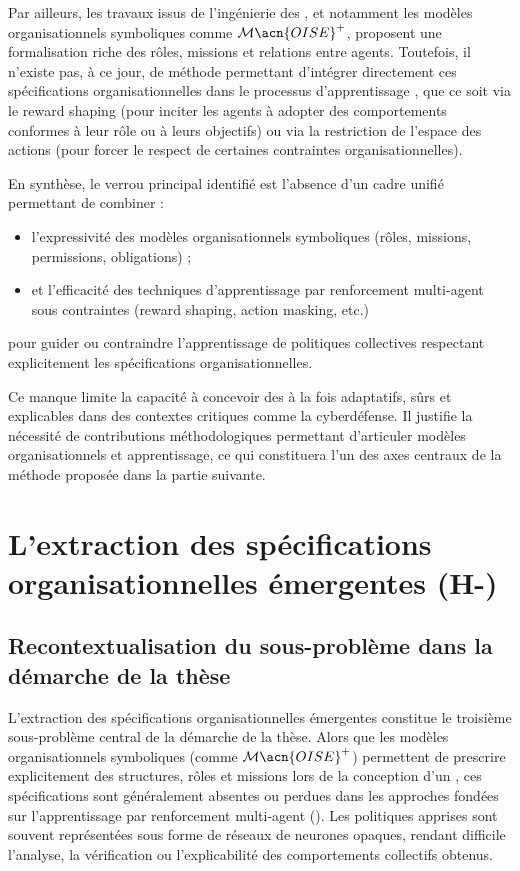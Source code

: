 Par ailleurs, les travaux issus de l’ingénierie des , et notamment les modèles organisationnels symboliques comme $\mathcal{M}\acn{OISE}^+$, proposent une formalisation riche des rôles, missions et relations entre agents. Toutefois, il n’existe pas, à ce jour, de méthode permettant d’intégrer directement ces spécifications organisationnelles dans le processus d’apprentissage , que ce soit via le reward shaping (pour inciter les agents à adopter des comportements conformes à leur rôle ou à leurs objectifs) ou via la restriction de l’espace des actions (pour forcer le respect de certaines contraintes organisationnelles).

En synthèse, le verrou principal identifié est l’absence d’un cadre unifié permettant de combiner :
\begin{itemize}
  \item l’expressivité des modèles organisationnels symboliques (rôles, missions, permissions, obligations) ;
  \item et l’efficacité des techniques d’apprentissage par renforcement multi-agent sous contraintes (reward shaping, action masking, etc.)
\end{itemize}
pour guider ou contraindre l’apprentissage de politiques collectives respectant explicitement les spécifications organisationnelles.

Ce manque limite la capacité à concevoir des  à la fois adaptatifs, sûrs et explicables dans des contextes critiques comme la cyberdéfense. Il justifie la nécessité de contributions méthodologiques permettant d’articuler modèles organisationnels et apprentissage, ce qui constituera l’un des axes centraux de la méthode proposée dans la partie suivante.


\section{L'extraction des spécifications organisationnelles émergentes (H-)}

\subsection*{Recontextualisation du sous-problème dans la démarche de la thèse}

L’extraction des spécifications organisationnelles émergentes constitue le troisième sous-problème central de la démarche de la thèse. Alors que les modèles organisationnels symboliques (comme $\mathcal{M}\acn{OISE}^+$) permettent de prescrire explicitement des structures, rôles et missions lors de la conception d’un , ces spécifications sont généralement absentes ou perdues dans les approches fondées sur l’apprentissage par renforcement multi-agent (). Les politiques apprises sont souvent représentées sous forme de réseaux de neurones opaques, rendant difficile l’analyse, la vérification ou l’explicabilité des comportements collectifs obtenus.

